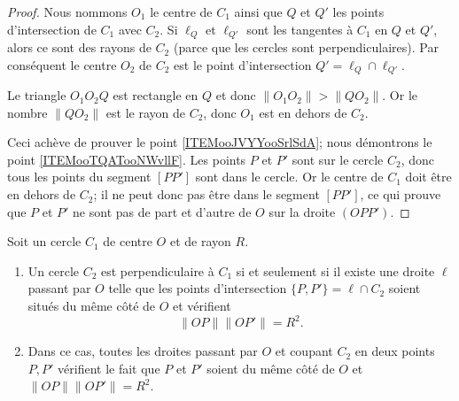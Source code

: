 \begin{proof}
    Nous nommons \( O_1\) le centre de \( C_1\) ainsi que \( Q\) et \( Q'\) les points d'intersection de \( C_1\) avec \( C_2\). Si \( \ell_Q\) et \( \ell_{Q'} \) sont les tangentes à \( C_1\) en \( Q\) et \( Q'\), alors ce sont des rayons de \( C_2\) (parce que les cercles sont perpendiculaires). Par conséquent le centre \( O_2\) de \( C_2\) est le point d'intersection \( Q'=\ell_Q\cap \ell_{Q'}\).

    Le triangle \( O_1O_2Q\) est rectangle en \( Q\) et donc \( \| O_1O_2 \|>\| QO_2 \| \). Or le nombre \( \| QO_2 \|\) est le rayon de \( C_2\), donc \( O_1\) est en dehors de \( C_2\).

    Ceci achève de prouver le point \ref{ITEMooJVYYooSrlSdA}; nous démontrons le point \ref{ITEMooTQATooNWvllF}. Les points \( P\) et \( P'\) sont sur le cercle \( C_2\), donc tous les points du segment \( [PP']  \) sont dans le cercle. Or le centre de \( C_1\) doit être en dehors de \( C_2\); il ne peut donc pas être dans le segment \( [PP']\), ce qui prouve que \( P\) et \( P'\) ne sont pas de part et d'autre de \( O\) sur la droite \( (OPP')\).
\end{proof}

\begin{proposition}      \label{PROPooYSVYooOFKxib}
    Soit un cercle \( C_1\) de centre \( O\) et de rayon \( R\).
    \begin{enumerate}
        \item       \label{ITEMooWYIJooAAmXUl}
            Un cercle \( C_2\) est perpendiculaire à \( C_1\) si et seulement si il existe une droite \( \ell\) passant par \( O\) telle que les points d'intersection \( \{ P,P' \}= \ell\cap C_2\) soient situés du même côté de \( O\) et vérifient
            \begin{equation}        \label{EQooDTAWooNYUXZX}
        \| OP \|\| OP' \|=R^2.
    \end{equation}
        \item       \label{ITEMooYKZOooYZKyhF}
            Dans ce cas, toutes les droites passant par \( O\) et coupant \( C_2\) en deux points \( P,P'\) vérifient le fait que \( P\) et \( P'\) soient du même côté de \( O\) et \( \| OP \|\| OP' \|=R^2\).
    \end{enumerate}
\end{proposition}

